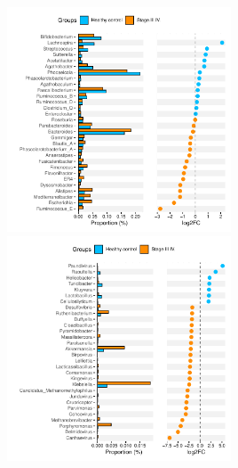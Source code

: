 \documentclass[
]{article}
\begin{document}
\includegraphics[width=0.5\textwidth,height=0.5\textheight]{../../Analysis_shotgun_PRJDB4176/04_Wilcoxon/atlas/output/class_PRJDB4176_pvalue0.05Stage.III.IV._Healthy.control_metagenomics.pdf}
\includegraphics[width=0.5\textwidth,height=0.5\textheight]{../../Analysis_shotgun_PRJDB4176/04_Wilcoxon/Kraken2/output/class_PRJDB4176_pvalue0.05Stage.III.IV._Healthy.control_metagenomics.pdf}
\end{document}
